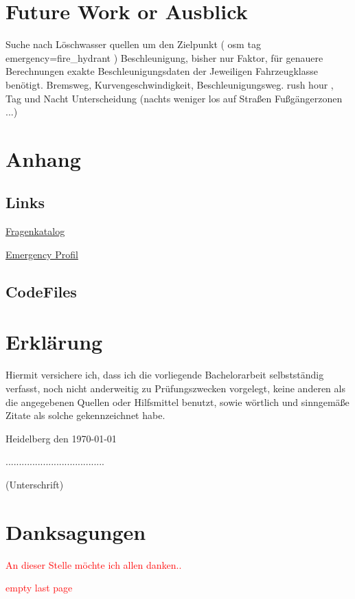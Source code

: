 \documentclass[12pt,a4paper]{article}
\newcommand\todo[1]{\textcolor{red}{#1}}
\begin{document}
\newpage
\section{Future Work or Ausblick}

Suche nach Löschwasser quellen um den Zielpunkt ( osm tag emergency=fire\_hydrant )
Beschleunigung, bisher nur Faktor, für genauere Berechnungen exakte Beschleunigungsdaten der Jeweiligen Fahrzeugklasse benötigt. Bremsweg, Kurvengeschwindigkeit, Beschleunigungsweg.
rush hour , Tag und Nacht Unterscheidung (nachts weniger los auf Straßen\/ Fußgängerzonen ...)

\newpage
\printbibliography
{}

\newpage
\section{Anhang}
\label{sec:anhang}

\subsection*{Links}

\href{https://docs.google.com/document/d/1nwjmea0jwauJWezk_2TMQs5CbAHv7he2NI4kxqMu2w4/}{Fragenkatalog}\par
\smallskip
\href{http://emergency.openrouteservice.org/reach?n1=48.456787&n2=10.823207&n3=14&a=48.454054,10.824484&b=5b&i=0&j1=5&j2=1&f3=3&f1=7.5&f2=2.5&f5=7&d=80&k1=en-US&k2=km}{Emergency Profil}

\subsection*{CodeFiles}

\newpage
\section*{Erklärung}
\vspace{1cm}
Hiermit versichere ich, dass ich die vorliegende Bachelorarbeit selbstständig verfasst, noch nicht anderweitig zu Prüfungszwecken vorgelegt, keine anderen als die angegebenen Quellen oder Hilfsmittel benutzt, sowie wörtlich und sinngemäße Zitate als solche gekennzeichnet habe.\par
\bigskip

{\flushleft Heidelberg den \today } {\hfill .....................................\par}
{\hfill (Unterschrift)}

\newpage
\section*{Danksagungen}
\todo{An dieser Stelle möchte ich allen danken.. }

\newpage
\todo{empty last page}
\end{document}
